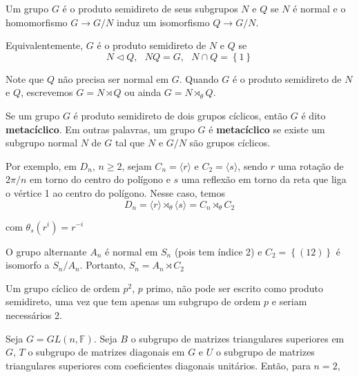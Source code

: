 	\begin{deff}
		\label{produto semidireto}
		Um grupo $G$ é o produto semidireto de seus subgrupos $N$ e $Q$ se $N$ é normal e o homomorfismo $G\to G/N$ induz um isomorfismo $Q\to G/N$.
		\par Equivalentemente, $G$ é o produto semidireto de $N$ e $Q$ se
		\begin{equation*}
		N\vartriangleleft Q, \text{ }NQ = G,\text{ }N\cap Q=\left\{1\right\}
		\end{equation*}
	\end{deff}
	\par\vspace{0.3cm} Note que $Q$ não precisa ser normal em $G$. Quando $G$ é o produto semidireto de $N$ e $Q$, escrevemos $G = N \rtimes Q$ ou ainda $G = N\rtimes_{\theta} Q$.
	\par\vspace{0.3cm} Se um grupo $G$ é produto semidireto de dois grupos cíclicos, então $G$ é dito \textbf{metacíclico}. Em outras palavras, um grupo $G$ é \textbf{metacíclico} se existe um subgrupo normal $N$ de $G$ tal que $N$ e $G/N$ são grupos cíclicos.
	\par\vspace{0.3cm} Por exemplo, em $D_n$, $n\geq2$, sejam $C_n = \langle r \rangle$ e $C_2 = \langle s \rangle$, sendo $r$ uma rotação de $2\pi/n$ em torno do centro do polígono e $s$ uma reflexão em torno da reta que liga o vértice 1 ao centro do polígono. Nesse caso, temos
	\begin{equation*}
	D_n = \langle r \rangle \rtimes_{\theta} \langle s \rangle = C_n\rtimes_{\theta}C_2
	\end{equation*}
	\par\vspace{0.3cm} com $\theta_s(r^i) = r^{-i}$
	\par\vspace{0.3cm} O grupo alternante $A_n$ é normal em $S_n$ (pois tem índice 2) e $C_2 = \left\{ (12) \right\}$ é isomorfo a $S_n/A_n$. Portanto, $S_n = A_n\rtimes C_2$
	\par\vspace{0.3cm} Um grupo cíclico de ordem $p^2$, $p$ primo, não pode ser escrito como produto semidireto, uma vez que tem apenas um subgrupo de ordem $p$ e seriam necessários 2.
	\par\vspace{0.3cm} Seja $G = GL(n,\mathbb{F})$. Seja $B$ o subgrupo de matrizes triangulares superiores em $G$, $T$ o subgrupo de matrizes diagonais em $G$ e $U$ o subgrupo de matrizes triangulares superiores com coeficientes diagonais unitários. Então, para $n=2$,
